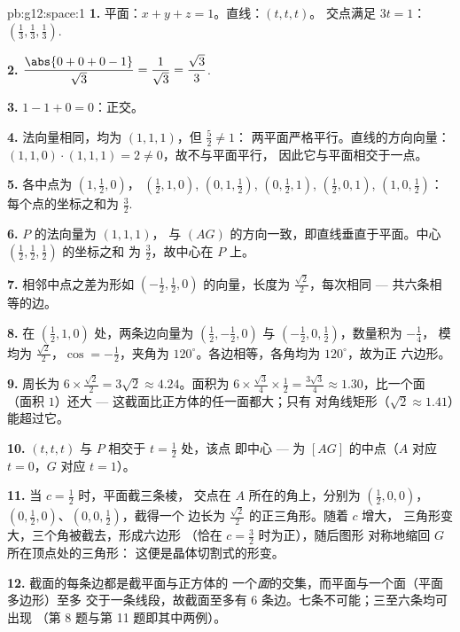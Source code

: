 \begin{solution}{pb:g12:space:1}
\textbf{1.} 平面：$x + y + z = 1$。直线：$(t, t, t)$。
交点满足 $3t = 1$：
$\left(\frac13, \frac13, \frac13\right)$.

\textbf{2.} $\dfrac{\abs{0 + 0 + 0 - 1}}{\sqrt3} =
\dfrac{1}{\sqrt3} = \dfrac{\sqrt3}{3}$.

\textbf{3.} $1 - 1 + 0 = 0$：正交。

\textbf{4.} 法向量相同，均为 $(1,1,1)$，但 $\frac52 \neq 1$：
两平面严格平行。直线的方向向量：
$(1,1,0) \cdot (1,1,1) = 2 \neq 0$，故不与平面平行，
因此它与平面相交于一点。

\textbf{5.} 各中点为 $\left(1, \frac12, 0\right)$，
$\left(\frac12, 1, 0\right)$, $\left(0, 1, \frac12\right)$,
$\left(0, \frac12, 1\right)$, $\left(\frac12, 0, 1\right)$,
$\left(1, 0, \frac12\right)$：每个点的坐标之和为
$\frac32$.

\textbf{6.} $P$ 的法向量为 $(1,1,1)$，
与 $(AG)$ 的方向一致，即直线垂直于平面。中心
$\left(\frac12,\frac12,\frac12\right)$ 的坐标之和
为 $\frac32$，故中心在 $P$ 上。

\textbf{7.} 相邻中点之差为形如
$\left(-\frac12, \frac12, 0\right)$ 的向量，长度为
$\frac{\sqrt2}{2}$，每次相同 --- 共六条相等的边。

\textbf{8.} 在 $\left(\frac12, 1, 0\right)$ 处，两条边向量为
$\left(\frac12, -\frac12, 0\right)$ 与
$\left(-\frac12, 0, \frac12\right)$，数量积为 $-\frac14$，
模均为 $\frac{\sqrt2}{2}$，$\cos = -\frac12$，夹角为
$120^\circ$。各边相等，各角均为 $120^\circ$，故为正
六边形。

\textbf{9.} 周长为 $6 \times \frac{\sqrt2}{2} = 3\sqrt2
\approx 4.24$。面积为 $6 \times \frac{\sqrt3}{4} \times
\frac12 = \frac{3\sqrt3}{4} \approx 1.30$，比一个面
（面积 $1$）还大 --- 这截面比正方体的任一面都大；只有
对角线矩形（$\sqrt2 \approx 1.41$）能超过它。

\textbf{10.} $(t,t,t)$ 与 $P$ 相交于 $t = \frac12$ 处，该点
即中心 --- 为 $[AG]$ 的中点（$A$ 对应 $t = 0$，$G$ 对应
$t = 1$）。

\textbf{11.} 当 $c = \frac12$ 时，平面截三条棱，
交点在 $A$ 所在的角上，分别为 $\left(\frac12,0,0\right)$，
$\left(0,\frac12,0\right)$、$\left(0,0,\frac12\right)$，截得一个
边长为 $\frac{\sqrt2}{2}$ 的正三角形。随着 $c$ 增大，
三角形变大，三个角被截去，形成六边形
（恰在 $c = \frac32$ 时为正），随后图形
对称地缩回 $G$ 所在顶点处的三角形：
这便是晶体切割式的形变。

\textbf{12.} 截面的每条边都是截平面与正方体的
一个\emph{面}的交集，而平面与一个面（平面多边形）至多
交于一条线段，故截面至多有
$6$ 条边。七条不可能；三至六条均可出现
（第 8 题与第 11 题即其中两例）。


\end{solution}
